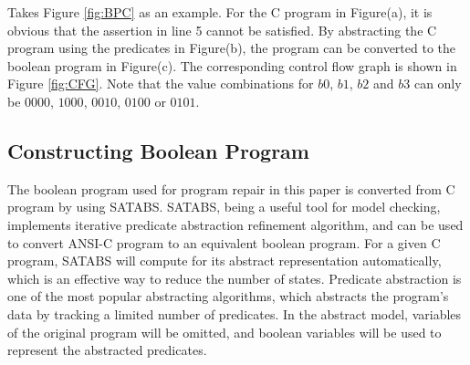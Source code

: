 Takes Figure \ref{fig:BPC} as an example. For the C program in Figure(a), it is obvious that the assertion in line 5 cannot be satisfied. By abstracting the C program using the predicates in Figure(b), the program can be converted to the boolean program in Figure(c). The corresponding control flow graph is shown in Figure \ref{fig:CFG}. Note that the value combinations for $b0$, $b1$, $b2$ and $b3$ can only be $0000$, $1000$, $0010$, $0100$ or $0101$.

\subsection{Constructing Boolean Program}
\label{section:ConstructingBooleanProgram}
The boolean program used for program repair in this paper is converted from C program by using SATABS\cite{SATABS}.
SATABS, being a useful tool for model checking, implements iterative predicate abstraction refinement algorithm\cite{CCoCaVUPAaI}, and can be used to convert ANSI-C program to an equivalent boolean program.
For a given C program, SATABS will compute for its abstract representation automatically, which is an effective way to reduce the number of states.
Predicate abstraction\cite{CoASGwPVS,GFSAoRSUDP} is one of the most popular abstracting algorithms, which abstracts the program's data by tracking a limited number of predicates.
In the abstract model, variables of the original program will be omitted, and boolean variables will be used to represent the abstracted predicates.
